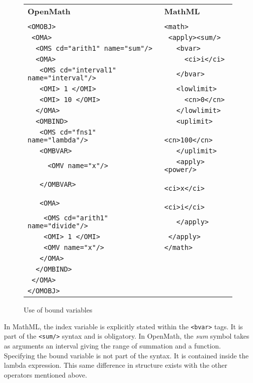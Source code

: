 \begin{figure}[h]
\begin{tabular}{ l l }    

{\bf OpenMath} 						& {\bf MathML}\\
							& \\
\verb|<OMOBJ>| 						&\verb|<math>| \\
\verb| <OMA>| 						&\verb| <apply><sum/>| \\
\verb|  <OMS cd="arith1" name="sum"/>|    		&\verb|   <bvar>| \\
\verb|  <OMA>|						&\verb|     <ci>i</ci>| \\
\verb|   <OMS cd="interval1" name="interval"/>| 	&\verb|   </bvar>| \\
\verb|   <OMI> 1 </OMI>|				&\verb|   <lowlimit>| \\
\verb|   <OMI> 10 </OMI>|				&\verb|     <cn>0</cn>| \\
\verb|  </OMA>|						&\verb|   </lowlimit>| \\
\verb|  <OMBIND>|					&\verb|   <uplimit>| \\
\verb|   <OMS cd="fns1" name="lambda"/>|		&\verb|     <cn>100</cn>| \\
\verb|   <OMBVAR>|					&\verb|   </uplimit>| \\
\verb|     <OMV name="x"/>|				&\verb|   <apply><power/>| \\
\verb|   </OMBVAR>|					&\verb|       <ci>x</ci>| \\
\verb|   <OMA>|						&\verb|       <ci>i</ci>| \\	
\verb|    <OMS cd="arith1" name="divide"/>|		&\verb|   </apply>| \\
\verb|    <OMI> 1 </OMI>|				&\verb| </apply>|  \\
\verb|    <OMV name="x"/>|				&\verb|</math>|   \\
\verb|   </OMA>|					& \\
\verb|  </OMBIND>|					& \\
\verb| </OMA>|						& \\
\verb|</OMOBJ>|						& \\

\end{tabular}  

\caption{Use of bound variables}
\label{bound}

\end{figure}

In MathML, the index variable is explicitly stated within the
\verb|<bvar>| tags. It is part of the \verb|<sum/>| syntax and is
obligatory.  In OpenMath, the {\it sum} symbol takes as arguments an
interval giving the range of summation and a function. Specifying the
bound variable is not part of the syntax. It is contained inside the
lambda expression. This same difference in structure exists with the
other operators mentioned above.

